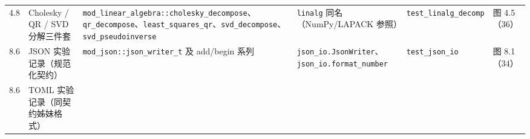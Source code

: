 \documentclass[
]{ctexbook}
\begin{document}
\begin{longtable}[]{@{}llllll@{}}
\begin{minipage}[t]{0.14\columnwidth}
4.8\strut
\end{minipage} & \begin{minipage}[t]{0.14\columnwidth}\raggedright
Cholesky / QR / SVD 分解三件套\strut
\end{minipage} & \begin{minipage}[t]{0.14\columnwidth}\raggedright
\texttt{mod\_linear\_algebra::cholesky\_decompose}、\texttt{qr\_decompose}、\texttt{least\_squares\_qr}、\texttt{svd\_decompose}、\texttt{svd\_pseudoinverse}\strut
\end{minipage} & \begin{minipage}[t]{0.14\columnwidth}\raggedright
\texttt{linalg} 同名（NumPy/LAPACK 参照）\strut
\end{minipage} & \begin{minipage}[t]{0.14\columnwidth}\raggedright
\texttt{test\_linalg\_decomp}\strut
\end{minipage} & \begin{minipage}[t]{0.14\columnwidth}\raggedright
图 4.5（36）\strut
\end{minipage}\tabularnewline
\begin{minipage}[t]{0.14\columnwidth}\raggedright
8.6\strut
\end{minipage} & \begin{minipage}[t]{0.14\columnwidth}\raggedright
JSON 实验记录（规范化契约）\strut
\end{minipage} & \begin{minipage}[t]{0.14\columnwidth}\raggedright
\texttt{mod\_json::json\_writer\_t} 及 add/begin 系列\strut
\end{minipage} & \begin{minipage}[t]{0.14\columnwidth}\raggedright
\texttt{json\_io.JsonWriter}、\texttt{json\_io.format\_number}\strut
\end{minipage} & \begin{minipage}[t]{0.14\columnwidth}\raggedright
\texttt{test\_json\_io}\strut
\end{minipage} & \begin{minipage}[t]{0.14\columnwidth}\raggedright
图 8.1（34）\strut
\end{minipage}\tabularnewline
\begin{minipage}[t]{0.14\columnwidth}\raggedright
8.6\strut
\end{minipage} & \begin{minipage}[t]{0.14\columnwidth}\raggedright
TOML 实验记录（同契约姊妹格式）\strut
\end{minipage} & \begin{minipage}[t]{0.14\columnwidth}\raggedright

\end{minipage}
\end{longtable}
\end{document}

